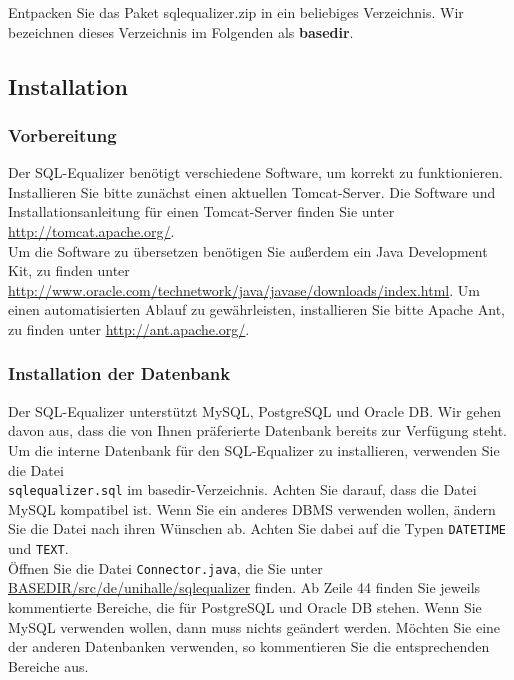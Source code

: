 \documentclass[12pt]{scrreprt}
\theoremstyle{remark}
\begin{document}
Entpacken Sie das Paket sqlequalizer.zip in ein beliebiges Verzeichnis. Wir bezeichnen dieses Verzeichnis im Folgenden als \textbf{basedir}.

\subsection{Installation}

\subsubsection{Vorbereitung}

Der SQL-Equalizer benötigt verschiedene Software, um korrekt zu funktionieren. Installieren Sie bitte zunächst einen aktuellen Tomcat-Server. Die Software und Installationsanleitung für einen Tomcat-Server finden Sie unter \url{http://tomcat.apache.org/}.\\

Um die Software zu übersetzen benötigen Sie außerdem ein Java Development Kit, zu finden unter \url{http://www.oracle.com/technetwork/java/javase/downloads/index.html}. Um einen automatisierten Ablauf zu gewährleisten, installieren Sie bitte Apache Ant, zu finden unter \url{http://ant.apache.org/}.\\

\subsubsection{Installation der Datenbank}

Der SQL-Equalizer unterstützt MySQL, PostgreSQL und Oracle DB. Wir gehen davon aus, dass die von Ihnen präferierte Datenbank bereits zur Verfügung steht.\\

Um die interne Datenbank für den SQL-Equalizer zu installieren, verwenden Sie die Datei\\\verb|sqlequalizer.sql| im basedir-Verzeichnis. Achten Sie darauf, dass die Datei MySQL kompatibel ist. Wenn Sie ein anderes DBMS verwenden wollen, ändern Sie die Datei nach ihren Wünschen ab. Achten Sie dabei auf die Typen \verb|DATETIME| und \verb|TEXT|.\\

Öffnen Sie die Datei \verb|Connector.java|, die Sie unter \url{BASEDIR/src/de/unihalle/sqlequalizer} finden. Ab Zeile 44 finden Sie jeweils kommentierte Bereiche, die für PostgreSQL und Oracle DB stehen. Wenn Sie MySQL verwenden wollen, dann muss nichts geändert werden. Möchten Sie eine der anderen Datenbanken verwenden, so kommentieren Sie die entsprechenden Bereiche aus.\\
\end{document}

